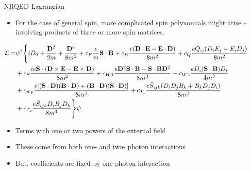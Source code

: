 \documentclass[11ppt]{beamer}
\newcommand{\beqa}{\begin{eqnarray*} }
\newcommand{\eeqa}{\end{eqnarray*} }
\newcommand{\beq}{\begin{equation*} }
\newcommand{\eeq}{\end{equation*} }
\begin{document}
\begin{frame}{NRQED Lagrangian}

\begin{itemize}
  \item For the case of general spin, more complicated spin polynomials might arise -- involving products of three or more spin matrices.
 \end{itemize}


\footnotesize

\beq 
\begin{split}
\mathcal{L} = & \psi^\dagger \Bigg\{
		iD_0 +  \frac{\v{D}^2}{2m}  + 	\frac{\v{D}^4}{8m^2}
		 + c_F \frac{e}{m} \v{S} \cdot \v{B}
		+ c_D \frac{e (\v{D} \cdot \v{E} - \v{E} \cdot \v{D})}{8m^2} 
		+ c_Q \frac{eQ_{ij}(D_i E_j - E_i D_j)}{8m^2}
\\	& + c_S \frac{ i e \v{S} \cdot(\v{D} \times \v{E} - \v{E} \times \v{D})}{8m^2}
		+ c_{W1} \frac{ e \v{D}^2 \v{S} \cdot \v{B} + \v{S} \cdot \v{B} \v{D}^2 }{8m^3}
		- c_{W2} \frac{e D_i (\v{S} \cdot \v{B}) D_i}{4m^3}
\\	&		+c_{p'p} \frac{ e [ (\v{S}\cdot \v{D})(\v{B} \cdot \v{D}) + (\v{B} \cdot \v{D})(\v{S}\cdot \v{D})]}{8m^3}
 	+ c_{T_1} \frac{ e \bar{S}_{ijk} (D_i D_j B_k + B_k D_j D_i)}{8m^3}
\\&		+ c_{T_2} \frac{ e \bar{S}_{ijk} D_i B_j D_k }{8m^3} 
		\Bigg \} \psi.
\end{split}
\eeq

\normalsize
\begin{itemize}
\item 	Terms with one or two powers of the external field
\item	These come from both one- and two- photon interactions
\item	But, coefficients are fixed by one-photon interaction

\end{itemize}

\end{frame}
\end{document}
